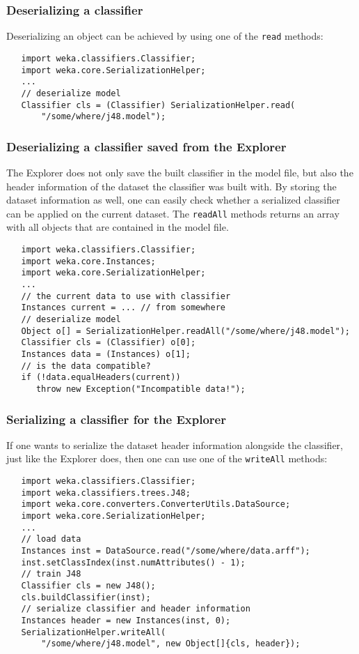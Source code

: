 \subsubsection*{Deserializing a classifier}
Deserializing an object can be achieved by using one of the \texttt{read}
methods:
\begin{verbatim}
   import weka.classifiers.Classifier;
   import weka.core.SerializationHelper;
   ...
   // deserialize model
   Classifier cls = (Classifier) SerializationHelper.read(
       "/some/where/j48.model");
\end{verbatim}

\newpage

\subsubsection*{Deserializing a classifier saved from the Explorer}
The Explorer does not only save the built classifier in the model
file, but also the header information of the dataset the classifier was built
with. By storing the dataset information as well, one can easily check whether a
serialized classifier can be applied on the current dataset. The \texttt{readAll}
methods returns an array with all objects that are contained in the model file.
\begin{verbatim}
   import weka.classifiers.Classifier;
   import weka.core.Instances;
   import weka.core.SerializationHelper;
   ...
   // the current data to use with classifier
   Instances current = ... // from somewhere
   // deserialize model
   Object o[] = SerializationHelper.readAll("/some/where/j48.model");
   Classifier cls = (Classifier) o[0];
   Instances data = (Instances) o[1];
   // is the data compatible?
   if (!data.equalHeaders(current))
      throw new Exception("Incompatible data!");
\end{verbatim}

\subsubsection*{Serializing a classifier for the Explorer}
If one wants to serialize the dataset header information alongside the
classifier, just like the Explorer does, then one can use one of the
\texttt{writeAll} methods:
\begin{verbatim}
   import weka.classifiers.Classifier;
   import weka.classifiers.trees.J48;
   import weka.core.converters.ConverterUtils.DataSource;
   import weka.core.SerializationHelper;
   ...
   // load data
   Instances inst = DataSource.read("/some/where/data.arff");
   inst.setClassIndex(inst.numAttributes() - 1);
   // train J48
   Classifier cls = new J48();
   cls.buildClassifier(inst);
   // serialize classifier and header information
   Instances header = new Instances(inst, 0);
   SerializationHelper.writeAll(
       "/some/where/j48.model", new Object[]{cls, header});
\end{verbatim}
